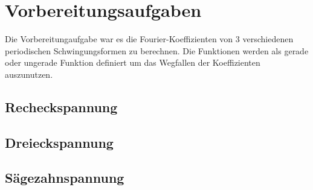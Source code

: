 \section{Vorbereitungsaufgaben}
Die Vorbereitungaufgabe war es die Fourier-Koeffizienten von 3 verschiedenen periodischen Schwingungsformen zu berechnen.
Die Funktionen werden als gerade oder ungerade Funktion definiert um das Wegfallen der Koeffizienten auszunutzen.
\subsection{Recheckspannung}

\subsection{Dreieckspannung}

\subsection{Sägezahnspannung}
